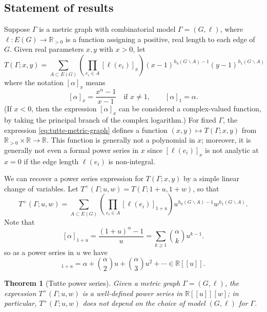 \documentclass{amsart}
\newtheorem{thm}{Theorem}
\theoremstyle{definition}
\newcommand{\RR}{\mathbb{R}}
\newcommand{\ZZ}{\mathbb{Z}}
\begin{document}
\subsection{Statement of results}
Suppose $\Gamma$ is a metric graph with combinatorial model $\Gamma = (G,\ell)$,
where $\ell : E(G) \to \RR_{>0}$ is a function assigning a positive, real 
 length to each edge of $G$.
Given real parameters $x,y$ with $x > 0$,
let 
\begin{equation}
\label{eq:tutte-metric-graph}
T(\Gamma; x,y) = \sum_{A \subset E(G)} \left( \prod_{e_i \in A} [\ell(e_i)]_{x} \right)
(x-1)^{h_0(G\backslash A) - 1}(y-1)^{h_1(G\backslash A)}
\end{equation}
where the notation $[\alpha]_x$ means
\begin{equation*}
\label{eq:q-analog-real}
[\alpha]_x = \frac{x^\alpha - 1}{x-1}
\quad\text{if } x \neq 1,
\qquad 
[\alpha]_1 = \alpha.
\end{equation*}
(If $x < 0$, then the expression $[\alpha]_x$ can be considered a complex-valued function,
by taking the principal branch of the complex logarithm.)
For fixed $\Gamma$,
the expression \eqref{eq:tutte-metric-graph} defines a function
$(x,y) \mapsto T(\Gamma; x,y)$ from $\RR_{>0}\times \RR \to \RR$.
This function is generally not a polynomial in $x$; %
moreover,  it is generally not even a formal power series in $x$ since
$[\ell(e_i)]_x$ is not analytic at $x = 0$ if the edge length $\ell(e_i)$ is non-integral.

We can recover a power series expression for $T(\Gamma; x,y)$ by a simple linear change of variables.
Let
$T^+(\Gamma; u,w) = T(\Gamma; 1 + u, 1 + w) $,
so that
\begin{equation}
T^+(\Gamma; u,w) = \sum_{A \subset E(G)} \left( \prod_{e_i \in A} [\ell(e_i)]_{1+u} \right)
u^{h_0(G\backslash A) - 1}w^{h_1(G\backslash A)} .
\end{equation}
Note that
\[ [\alpha]_{1+u} = \frac{(1+u)^\alpha - 1}{u}
= \sum_{k \geq 1} \binom{\alpha}{k}u^{k-1} .
\]
so as a power series in $u$ we have 
\begin{equation}
[\alpha]_{1+u} = \alpha + \binom{\alpha}{2} u + \binom{\alpha}{3} u^2 + \cdots
\in \RR[[u]] .
\end{equation}


\begin{thm}[Tutte power series]
Given a metric graph $\Gamma = (G,\ell)$,
the expression $T^+(\Gamma; u,w)$
is a well-defined power series in
$\RR[[u]][w]$;
in particular,
$T^+(\Gamma; u,w)$ does not depend on the choice of model $(G,\ell)$ for $\Gamma$.
\end{thm}
\end{document}
